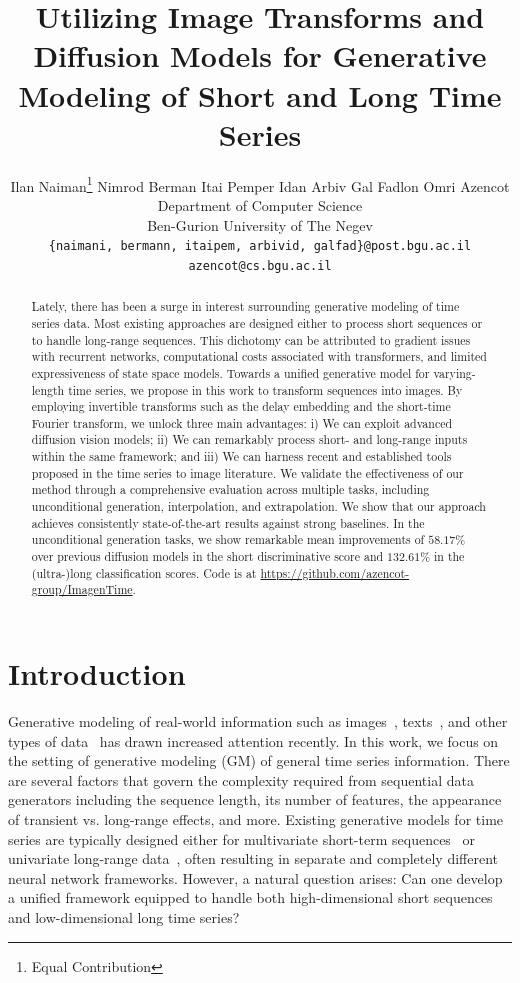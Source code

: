 \documentclass{article}
\title{Utilizing Image Transforms and Diffusion Models for  Generative Modeling of Short and Long Time Series}
\author{%
Ilan Naiman\thanks{Equal Contribution} \hspace{0.3em}
Nimrod Berman\footnotemark[1] \hspace{0.3em}
Itai Pemper \hspace{0.3em}
Idan Arbiv \hspace{0.3em}
Gal Fadlon \hspace{0.3em}
Omri Azencot \\
Department of Computer Science \\
Ben-Gurion University of The Negev \\
\tt\small{{\{naimani, bermann, itaipem, arbivid, galfad\}@post.bgu.ac.il}} \\
\tt\small{{azencot@cs.bgu.ac.il}} \\
}
\begin{document}
\maketitle


\begin{abstract}
  Lately, there has been a surge in interest surrounding generative modeling of time series data. Most existing approaches are designed either to process short sequences or to handle long-range sequences. This dichotomy can be attributed to gradient issues with recurrent networks, computational costs associated with transformers, and limited expressiveness of state space models. Towards a unified generative model for varying-length time series, we propose in this work to transform sequences into images. By employing invertible transforms such as the delay embedding and the short-time Fourier transform, we unlock three main advantages: i) We can exploit advanced diffusion vision models; ii) We can remarkably process short- and long-range inputs within the same framework; and iii) We can harness recent and established tools proposed in the time series to image literature. We validate the effectiveness of our method through a comprehensive evaluation across multiple tasks, including unconditional generation, interpolation, and extrapolation. We show that our approach achieves consistently state-of-the-art results against strong baselines. In the unconditional generation tasks, we show remarkable mean improvements of $58.17\%$ over previous diffusion models in the short discriminative score and $132.61\%$ in the (ultra-)long classification scores. Code is at \url{https://github.com/azencot-group/ImagenTime}.
\end{abstract}


\section{Introduction}

Generative modeling of real-world information such as images~\cite{ramesh2022hierarchical}, texts~\cite{brown2020language}, and other types of data~\cite{yoon2019time, li2021sp, bar2024lumiere} has drawn increased attention recently. In this work, we focus on the setting of generative modeling (GM) of general time series information. There are several factors that govern the complexity required from sequential data generators including the sequence length, its number of features, the appearance of transient vs. long-range effects, and more. Existing generative models for time series are typically designed either for multivariate short-term sequences~\cite{jeon2022gt, coletta2024constrained} or univariate long-range data~\cite{zhou2023deep}, often resulting in separate and completely different neural network frameworks. However, a natural question arises: Can one develop a unified framework equipped to handle both high-dimensional short sequences and low-dimensional long time series? 
\end{document}
